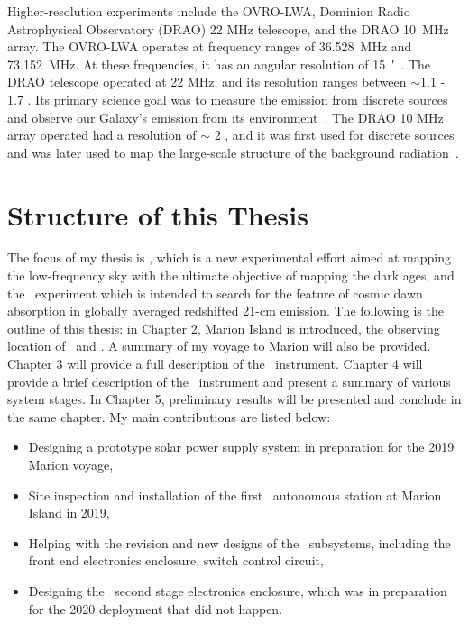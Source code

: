 Higher-resolution experiments include the OVRO-LWA, Dominion Radio Astrophysical Observatory (DRAO) 22 MHz telescope, and the DRAO \SI{10}{\mega\hertz} array. The OVRO-LWA operates at frequency ranges of \SI{36.528}{\mega\hertz} and \SI{73.152}{\mega\hertz}. At these frequencies, it has an angular resolution of \SI{15}{\arcminute}~\citep{2018AJ....156...32E}. The DRAO telescope operated at 22 MHz, and its resolution ranges between $\sim$1.1 \degree - 1.7 \degree. Its primary science goal was to measure the emission from discrete sources and observe our Galaxy's emission from its environment~\citep{1999A&AS..137....7R}. The DRAO 10 MHz array operated had a resolution of $\sim$ 2  \degree, and it was first used for discrete sources and was later used to map the large-scale structure of the background radiation~\citep{1976MNRAS.177..601C}.

\section{Structure of this Thesis}

The focus of my thesis is \albatros, which is a new experimental effort aimed at mapping the low-frequency sky with the ultimate objective of mapping the dark ages, and the \prizm\ experiment which is intended to search for the feature of cosmic dawn absorption in globally averaged redshifted 21-cm emission. The following is the outline of this thesis: in Chapter 2, Marion Island is introduced, the observing location of \prizm\ and \albatros. A summary of my voyage to Marion will also be provided. Chapter 3 will provide a full description of the \albatros\ instrument. Chapter 4 will provide a brief description of the \prizm\ instrument and present a summary of various system stages. In Chapter 5, preliminary results will be presented and conclude in the same chapter. My main contributions are listed below:
\begin{itemize}
	\item Designing a prototype solar power supply system in preparation for the 2019 Marion voyage, 
	\item Site inspection and installation of the first \albatros\ autonomous station at Marion Island in 2019,
	\item Helping with the revision and new designs of the \prizm\ subsystems, including the front end electronics enclosure, switch control circuit, 
	\item Designing the \prizm\ second stage electronics enclosure, which was in preparation for the 2020 deployment that did not happen.
\end{itemize}
